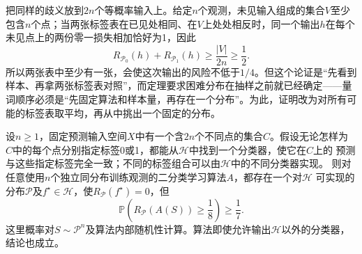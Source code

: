 把同样的歧义放到$2n$个等概率输入上。给定$n$个观测，未见输入组成的集合$V$至少包含$n$个点；当两张标签表在已见处相同、在$V$上处处相反时，同一个输出$h$在每个未见点上的两份零一损失相加恰好为1，因此
\[
 R_{\mathcal P_0}(h)+R_{\mathcal P_1}(h)
 \geq\frac{|V|}{2n}\geq\frac12.
\]
所以两张表中至少有一张，会使这次输出的风险不低于$1/4$。但这个论证是“先看到样本、再拿两张标签表对照”，而定理要求困难分布在抽样之前就已经确定——量词顺序必须是“先固定算法和样本量，再存在一个分布”。为此，证明改为对所有可能的标签表取平均，再从中挑出一个固定的分布。

\begin{theorem}[没有免费的午餐]
\label{thm:no-free-lunch-classification}
设$n\geq1$，固定预测输入空间$X$中有一个含$2n$个不同点的集合$C$。假设无论怎样为
$C$中的每个点分别指定标签0或1，都能从$\mathcal H$中找到一个分类器，使它在$C$上的
预测与这些指定标签完全一致；不同的标签组合可以由$\mathcal H$中的不同分类器实现。
则对任意使用$n$个独立同分布训练观测的二分类学习算法$A$，都存在一个对$\mathcal H$
可实现的分布$\mathcal P$及$f^\star\in\mathcal H$，使$R_{\mathcal P}(f^\star)=0$，但
\begin{equation}
 \mathbb P\left(R_{\mathcal P}(A(S))\geq\frac18\right)\geq\frac17.
 \label{eq:no-free-lunch-probability}
\end{equation}
这里概率对$S\sim\mathcal P^n$及算法内部随机性计算。算法即使允许输出$\mathcal H$以外的分类器，结论也成立。
\end{theorem}

